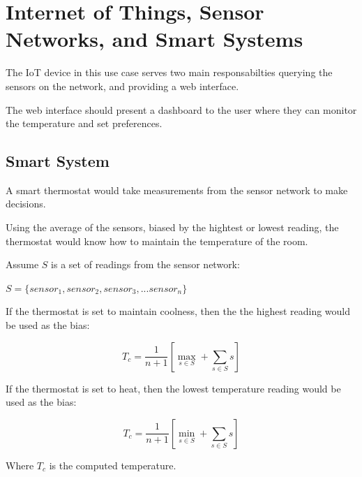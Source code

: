 \documentclass[10pt, journal]{IEEEtran} %
\begin{document}




\section{Internet of Things, Sensor Networks, and Smart Systems}

The IoT device in this use case serves two main responsabilties 
querying the sensors on the network, and providing a web interface.

The web interface should present a dashboard to the user where they can
monitor the temperature and set preferences.


\subsection{Smart System}

A smart thermostat would take measurements from the sensor network to make decisions.

Using the average of the sensors, biased by the hightest or lowest reading,
the thermostat would know how to maintain the temperature of the room.


Assume $S$ is a set of readings from the sensor network:

$S = \{sensor_1, sensor_2, sensor_3, ...sensor_n\}$

\bigskip

If the thermostat is set to maintain coolness,
then the the highest reading would be used as the bias:

\[
T_c = \frac{1}{n+1}\left[ \max_{s \in S} + \sum_{s \in S}{s} \right]
\]

\smallskip

If the thermostat is set to heat,
then the lowest temperature reading would be used as the bias:

\[
T_c = \frac{1}{n+1}\left[ \min_{s \in S} + \sum_{s \in S}{s} \right]
\]

Where $T_c$ is the computed temperature.

\bigskip
\end{document}
